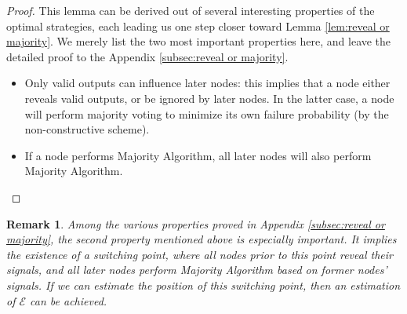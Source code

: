 \documentclass[a4paper,UKenglish]{lipics}
\newtheorem{rmk}{Remark}
\theoremstyle{definition}
\begin{document}
\begin{proof}
This lemma can be derived out of several interesting properties of the optimal strategies,
	each leading us one step closer toward Lemma \ref{lem:reveal or majority}.
We merely list the two most important properties here, and leave the detailed proof to the Appendix \ref{subsec:reveal or majority}.
\begin{itemize}
\item Only valid outputs can influence later nodes: this implies that a node either reveals valid outputs,
		or be ignored by later nodes.
	In the latter case, a node will perform majority voting to minimize its own failure probability (by the non-constructive scheme).
\item If a node performs Majority Algorithm, all later nodes will also perform Majority Algorithm.
\end{itemize}
\end{proof}

\begin{rmk}
\label{rmk1}
Among the various properties proved in Appendix \ref{subsec:reveal or majority}, the second property mentioned above is especially important.
It implies the existence of a switching point, 
	where all nodes prior to this point reveal their signals, 
	and all later nodes perform Majority Algorithm based on former nodes' signals. 
If we can estimate the position of this switching point,
	then an estimation of $\mathcal{E}$ can be achieved.
\end{rmk}
\end{document}
